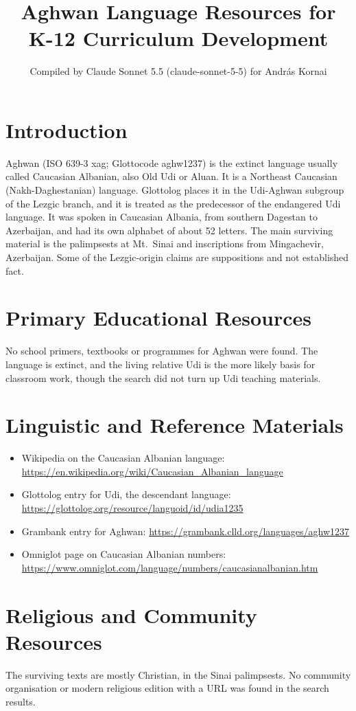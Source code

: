 \documentclass[12pt]{article}
\title{Aghwan Language Resources for K-12 Curriculum Development}
\author{Compiled by Claude Sonnet 5.5 (claude-sonnet-5-5) for Andr\'as Kornai}
\date{}
\begin{document}
\maketitle

\section{Introduction}
Aghwan (ISO 639-3 xag; Glottocode aghw1237) is the extinct language usually called Caucasian Albanian, also Old Udi or Aluan. It is a Northeast Caucasian (Nakh-Daghestanian) language. Glottolog places it in the Udi-Aghwan subgroup of the Lezgic branch, and it is treated as the predecessor of the endangered Udi language. It was spoken in Caucasian Albania, from southern Dagestan to Azerbaijan, and had its own alphabet of about 52 letters. The main surviving material is the palimpsests at Mt.\ Sinai and inscriptions from Mingachevir, Azerbaijan. Some of the Lezgic-origin claims are suppositions and not established fact.

\section{Primary Educational Resources}
No school primers, textbooks or programmes for Aghwan were found. The language is extinct, and the living relative Udi is the more likely basis for classroom work, though the search did not turn up Udi teaching materials.

\section{Linguistic and Reference Materials}
\begin{itemize}
\item Wikipedia on the Caucasian Albanian language: \url{https://en.wikipedia.org/wiki/Caucasian_Albanian_language}
\item Glottolog entry for Udi, the descendant language: \url{https://glottolog.org/resource/languoid/id/udia1235}
\item Grambank entry for Aghwan: \url{https://grambank.clld.org/languages/aghw1237}
\item Omniglot page on Caucasian Albanian numbers: \url{https://www.omniglot.com/language/numbers/caucasianalbanian.htm}
\end{itemize}

\section{Religious and Community Resources}
The surviving texts are mostly Christian, in the Sinai palimpsests. No community organisation or modern religious edition with a URL was found in the search results.
\end{document}
